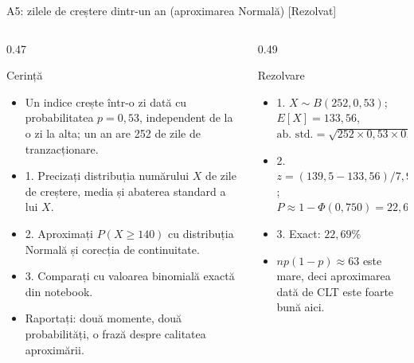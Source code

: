 \begin{frame}{A5: zilele de creștere dintr-un an (aproximarea Normală) [Rezolvat]}
\itemsize{\footnotesize}
\begin{columns}[T]
\begin{column}{0.47\textwidth}
\begin{block}{Cerință}
\begin{itemize}
    \item Un indice crește într-o zi dată cu probabilitatea $p = 0{,}53$, independent de la o zi la alta; un an are 252 de zile de tranzacționare.
    \item 1. Precizați distribuția numărului $X$ de zile de creștere, media și abaterea standard a lui $X$.
    \item 2. Aproximați $P(X \ge 140)$ cu distribuția Normală și corecția de continuitate.
    \item 3. Comparați cu valoarea binomială exactă din notebook.
    \item Raportați: două momente, două probabilități, o frază despre calitatea aproximării.
\end{itemize}
\end{block}
\end{column}
\begin{column}{0.49\textwidth}
\begin{exampleblock}{Rezolvare}
\begin{itemize}
    \item 1. $X \sim B(252, 0{,}53)$; $E[X] = 133{,}56$, $\text{ab. std.} = \sqrt{252 \times 0{,}53 \times 0{,}47} = 7{,}92$
    \item 2. $z = (139{,}5 - 133{,}56)/7{,}92 = 0{,}750$; $P \approx 1 - \Phi(0{,}750) = 22{,}67\%$
    \item 3. Exact: $22{,}69\%$
    \item $np(1-p) \approx 63$ este mare, deci aproximarea dată de CLT este foarte bună aici.
\end{itemize}
\end{exampleblock}
\end{column}
\end{columns}
\end{frame}

